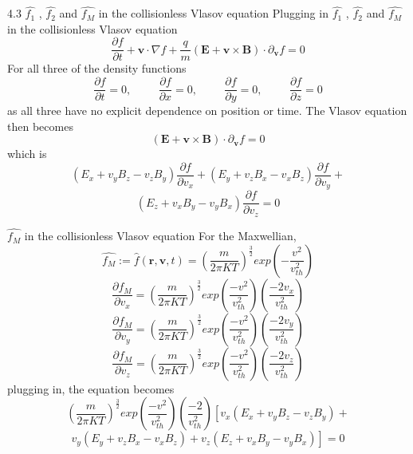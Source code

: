 \documentclass{beamer}
\begin{document}
	\begin{frame}[t]{4.3 $\hat{f_{1}}$ , $\hat{f_{2}}$ and $\widehat{f_{M}}$ in  the collisionless Vlasov equation}
		Plugging in  $\hat{f_{1}}$ , $\hat{f_{2}}$ and $\widehat{f_{M}}$ in  the collisionless Vlasov equation
		$$ \frac{\partial f}{\partial t} + \textbf{v} \cdot \nabla f + \frac{q}{m} \left(\mathrm{\textbf{E}}+\textbf{v} \times \mathrm{\textbf{B}} \right) \cdot {\partial}_{\textbf{v}} f = 0 $$
		For all three of the density functions
		$$\frac{\displaystyle \partial f}{\displaystyle \partial t} = 0 \mathrm{,} \hspace{1cm} \frac{\displaystyle \partial f}{\displaystyle \partial x} = 0 \mathrm{,} \hspace{1cm} \frac{\displaystyle \partial f}{\displaystyle \partial y} = 0 \mathrm{,} \hspace{1cm} \frac{\displaystyle \partial f}{\displaystyle \partial z} = 0 $$ as all three have no explicit dependence on position or time. The Vlasov equation then becomes $$ \left(\mathrm{\textbf{E}}+\textbf{v} \times \mathrm{\textbf{B}} \right) \cdot {\partial}_{\textbf{v}} f = 0 $$ which is
		$$ \left(E_{x} + v_{y} B_{z} - v_{z} B_{y}\right) \frac{\displaystyle \partial f}{\displaystyle \partial v_{x}} + \left(E_{y} + v_{z} B_{x} - v_{x} B_{z}\right) \frac{\displaystyle \partial f}{\displaystyle \partial v_{y}} + $$ $$\left(E_{z} + v_{x} B_{y} - v_{y} B_{x}\right) \frac{\displaystyle \partial f}{\displaystyle \partial v_{z}} = 0$$
		
	\end{frame}
	
	\begin{frame}[t]{$\widehat{f_{M}}$ in  the collisionless Vlasov equation}
		For the Maxwellian, $$ 	\widehat{f_{M}} := \hat{f}(\textbf{r}, \textbf{v}, t) = \left(\frac{m}{2\pi KT}\right)^{\frac{3}{2}} exp \left(-\frac{v^{2}}{v_{th}^{2}}\right) $$
		$$\frac{\displaystyle \partial f_{M}}{\displaystyle \partial v_{x}} = \left(\frac{m}{2 \pi K T}\right)^{\frac{3}{2}}  exp \left(\frac{-v^{2}}{v_{th}^{2}}\right)\left(\frac{-2 v_{x}}{v_{th}^{2}}\right)$$ $$ \frac{\displaystyle \partial f_{M}}{\displaystyle \partial v_{y}} = \left(\frac{m}{2 \pi K T}\right)^{\frac{3}{2}}  exp  \left(\frac{-v^{2}}{v_{th}^{2}}\right)\left(\frac{-2 v_{y}}{v_{th}^{2}}\right)$$ $$\frac{\displaystyle \partial f_{M}}{\displaystyle \partial v_{z}} = \left(\frac{m}{2 \pi K T}\right)^{\frac{3}{2}}  exp  \left(\frac{-v^{2}}{v_{th}^{2}}\right)\left(\frac{-2 v_{z}}{v_{th}^{2}}\right)$$
		plugging in, the equation becomes
		$$\left(\frac{m}{2 \pi K T}\right)^{\frac{3}{2}}  exp  \left(\frac{-v^{2}}{v_{th}^{2}}\right)\left(\frac{-2}{v_{th}^{2}}\right) \left[v_{x}\left( E_{x} + v_{y} B_{z} - v_{z} B_{y} \right) + \right. $$ $$v_{y} \left( E_{y} + v_{z} B_{x} - v_{x} B_{z} \right) + \left. v_{z} \left(E_{z} + v_{x} B_{y} - v_{y} B_{x}\right) \right] = 0$$
		
	\end{frame}
\end{document}
